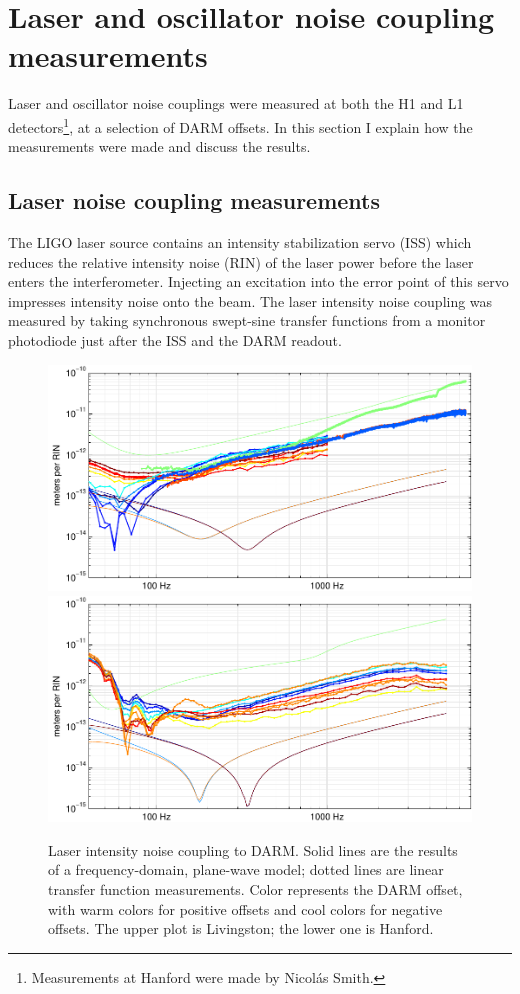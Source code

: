 \section{Laser and oscillator noise coupling measurements}

Laser and oscillator noise couplings were measured at both the H1 and
L1 detectors\footnote{Measurements at Hanford were made by Nicol\'as
  Smith.}, at a selection of DARM offsets.  In this section I explain
how the measurements were made and discuss the results.

\subsection{Laser noise coupling measurements}

The LIGO laser source contains an intensity stabilization servo (ISS)
which reduces the relative intensity noise (RIN) of the laser power
before the laser enters the interferometer.  Injecting an excitation
into the error point of this servo impresses intensity noise onto the
beam.  The laser intensity noise coupling was measured by taking
synchronous swept-sine transfer functions from a monitor photodiode
just after the ISS and the DARM readout.

\begin{figure}[]   %
\includegraphics[]{figures/laserAM-L1.pdf}
\includegraphics[]{figures/laserAM-H1.pdf}
\caption[Laser intensity noise coupling (measured and modeled)]{Laser intensity noise coupling to DARM.
  Solid lines are the results of a frequency-domain, plane-wave model; dotted lines are linear transfer function measurements.  Color represents the DARM offset, with warm colors for positive offsets and cool colors for negative offsets.  The upper plot is Livingston; the lower one is Hanford.}
\end{figure}

